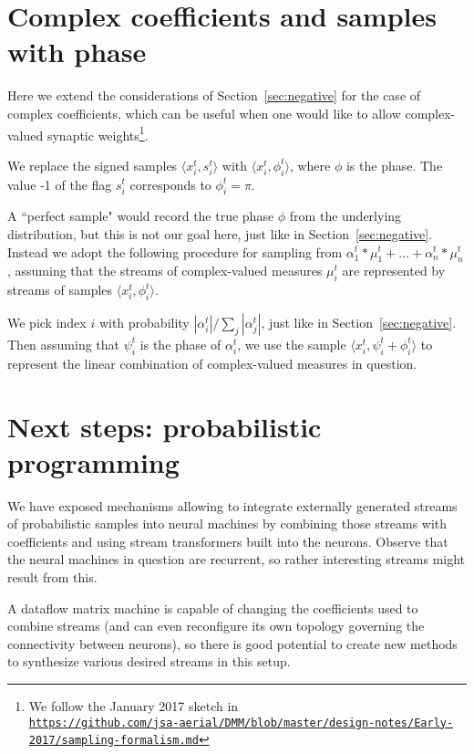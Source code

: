 \documentclass{article}
\begin{document}
\section{Complex coefficients and samples with phase}

Here we extend the considerations of Section~\ref{sec:negative} for the case of complex coefficients,
which can be useful when one would like to allow complex-valued synaptic weights\footnote{We follow the January 2017 sketch in\\
\href{https://github.com/jsa-aerial/DMM/blob/master/design-notes/Early-2017/sampling-formalism.md}
{\tt https://github.com/jsa-aerial/DMM/blob/master/design-notes/Early-2017/sampling-formalism.md}}.

We replace the signed samples $\langle x_i^t, s_i^t \rangle$ with $\langle x_i^t, \phi_i^t \rangle$, where $\phi$ is the phase.
The value -1 of the flag $s_i^t$ corresponds to $\phi_i^t = \pi$.

A ``perfect sample" would record the true phase $\phi$ from the underlying distribution, but this is not our goal here, just like in
Section~\ref{sec:negative}. Instead we adopt the following procedure for sampling from $\alpha_1^t * \mu_1^t + \dots +  \alpha_n^t * \mu_n^t$,
assuming that the streams of complex-valued measures $\mu_i^t$ are represented by streams of
samples $\langle x_i^t, \phi_i^t \rangle$.  

We pick index $i$ with probability $|\alpha_i^t|/\sum_j |\alpha_j^t| $, just like in Section~\ref{sec:negative}.
Then assuming that $\psi_i^t$ is the phase of $\alpha_i^t$, we use  the sample $\langle x_i^t, \psi_i^t+ \phi_i^t \rangle$ to represent the
linear combination of complex-valued measures in question.




\section{Next steps: probabilistic programming}

We have exposed mechanisms allowing to integrate externally generated streams of probabilistic samples into neural machines by
combining those streams with coefficients and using stream transformers built into the neurons. 
Observe that the neural machines in question are recurrent, so rather interesting streams might result from this.

A dataflow matrix machine is capable of changing the coefficients used to combine streams (and can even reconfigure its own topology governing the connectivity between neurons),
so there is good potential to create new methods to synthesize various desired streams in this setup.
\end{document}
